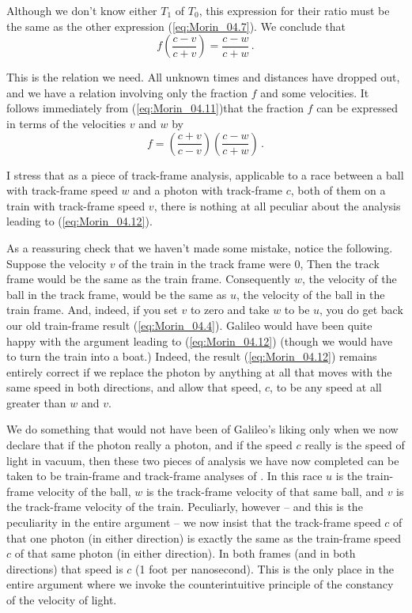 Although we don't know either $T_1$ of $T_0$, this expression for their ratio must be the same as the other expression (\ref{eq:Morin_04.7}). We conclude that 
\begin{equation}\label{eq:Morin_04.11}
f \left( \frac{c - v}{c + v}  \right) = \frac{c - w}{c + w} \,.
\end{equation}

This is the relation we need. All unknown times and distances have dropped out, and we have a relation involving only the fraction $f$ and some velocities. It follows immediately from (\ref{eq:Morin_04.11})that the fraction $f$ can be expressed in terms of the velocities $v$ and $w$ by
\begin{equation}\label{eq:Morin_04.12}
f = \left( \frac{c + v}{c - v} \right)\left( \frac{c - w}{c + w} \right) \,.
\end{equation}

I stress that as a piece of track-frame analysis, applicable to a race between a ball with track-frame speed $w$ and a photon with track-frame $c$, both of them on a train with track-frame speed $v$, there is nothing at all peculiar about the analysis leading to (\ref{eq:Morin_04.12}). 

As a reassuring check that we haven't made some mistake, notice the following. Suppose the velocity $v$ of the train in the track frame were $0$, Then the track frame would be the same as the train frame. Consequently $w$, the velocity of the ball in the track frame, would be the same as $u$, the velocity of the ball in the train frame. And, indeed, if you set $v$ to zero and take $w$ to be $u$, you do get back our old train-frame result (\ref{eq:Morin_04.4}). Galileo would have been quite happy with the argument leading to (\ref{eq:Morin_04.12}) (though we would have to turn the train into a boat.) Indeed, the result (\ref{eq:Morin_04.12}) remains entirely correct if we replace the photon by anything at all that moves with the same speed in both directions, and allow that speed, $c$, to be any speed at all greater than $w$ and $v$.

We do something that would not have been of Galileo's liking only when we now declare that if the photon really  a photon, and if the speed $c$ really is the speed of light in vacuum, then these two pieces of analysis we have now completed can be taken to be train-frame and track-frame analyses of . In this race $u$ is the train-frame velocity of the ball, $w$ is the track-frame velocity of that same ball, and $v$ is the track-frame velocity of the train. Peculiarly, however -- and this is the  peculiarity in the entire argument -- we now insist that the track-frame speed $c$ of that one photon (in either direction) is exactly the same as the train-frame speed $c$ of that same photon (in either direction). In both frames (and in both directions) that speed is $c$ (1 foot per nanosecond). This is the only place in the entire argument where we invoke the counterintuitive principle of the constancy of the velocity of light. 


